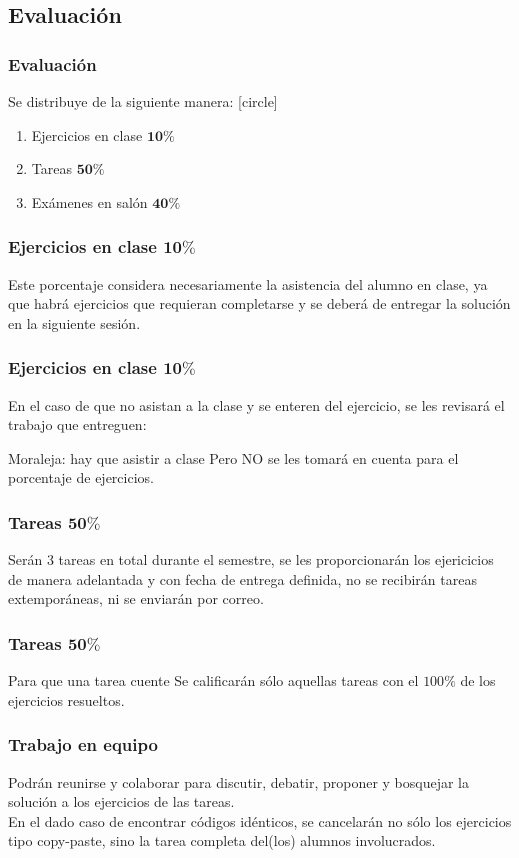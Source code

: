 \documentclass[12pt]{beamer}
\begin{document}
\subsection{Evaluación}
\begin{frame}
\frametitle{Evaluación}
Se distribuye de la siguiente manera:
[circle]
\begin{enumerate}[<+->]
\item Ejercicios en clase $\mathbf{10\%}$
\item Tareas $\mathbf{50\%}$
\item Exámenes en salón $\mathbf{40\%}$
\end{enumerate}
\end{frame}
\begin{frame}
\frametitle{Ejercicios en clase $\mathbf{10\%}$}
Este porcentaje considera necesariamente la asistencia del alumno en clase, ya que habrá ejercicios que requieran completarse y se deberá de entregar la solución en la siguiente sesión.
\end{frame}
\begin{frame}
\frametitle{Ejercicios en clase $\mathbf{10\%}$}
En el caso de que no asistan a la clase y se enteren del ejercicio, se les revisará el trabajo que entreguen:
\pause
\begin{alertblock}{Moraleja: hay que asistir a clase}
Pero NO se les tomará en cuenta para el porcentaje de ejercicios.
\end{alertblock}
\end{frame}
\begin{frame}
\frametitle{Tareas $\mathbf{50\%}$}
Serán 3 tareas en total durante el semestre, se les proporcionarán los ejericicios de manera adelantada y con fecha de entrega definida, no se recibirán tareas extemporáneas, ni se enviarán por correo.
\end{frame}
\begin{frame}
\frametitle{Tareas $\mathbf{50\%}$}
\begin{exampleblock}{Para que una tarea cuente}
Se calificarán sólo aquellas tareas con el $100\%$ de los ejercicios resueltos.
\end{exampleblock} 
\end{frame}
\begin{frame}
\frametitle{Trabajo en equipo}
Podrán reunirse y colaborar para discutir, debatir, proponer y bosquejar la solución a los ejercicios de las tareas.
\\
\bigskip
En el dado caso de encontrar códigos idénticos, se cancelarán no sólo los ejercicios tipo copy-paste, sino la tarea completa del(los) alumnos involucrados.
\end{frame}
\end{document}
